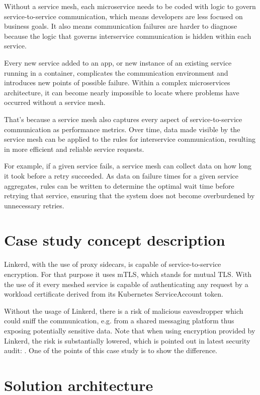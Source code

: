 \documentclass{article}
\begin{document}
Without a service mesh, each microservice needs to be coded with logic to
govern service-to-service communication, which means developers are less
focused on business goals. It also means communication failures are harder to
diagnose because the logic that governs interservice communication is hidden
within each service.

Every new service added to an app, or new instance of an existing service
running in a container, complicates the communication environment and
introduces new points of possible failure. Within a complex microservices
architecture, it can become nearly impossible to locate where problems have
occurred without a service mesh.

That's because a service mesh also captures every aspect of service-to-service
communication as performance metrics. Over time, data made visible by the
service mesh can be applied to the rules for interservice communication,
resulting in more efficient and reliable service requests.

For example, if a given service fails, a service mesh can collect data on how
long it took before a retry succeeded. As data on failure times for a given
service aggregates, rules can be written to determine the optimal wait time
before retrying that service, ensuring that the system does not become
overburdened by unnecessary retries.

\section{Case study concept description}

Linkerd, with the use of proxy sidecars, is capable of service-to-service
encryption. For that purpose it uses mTLS, which stands for mutual TLS.
With the use of it every meshed service is capable of authenticating any
request by a workload certificate derived from its Kubernetes ServiceAccount
token.

Without the usage of Linkerd, there is a risk of malicious eavesdropper which
could sniff the communication, e.g. from a shared messaging platform thus exposing
potentially sensitive data. Note that when using encryption provided by Linkerd,
the risk is substantially lowered, which is pointed out in latest security audit:
\cite{linkerd:audit}. One of the points of this case study is to show the difference.

\section{Solution architecture}
\end{document}
